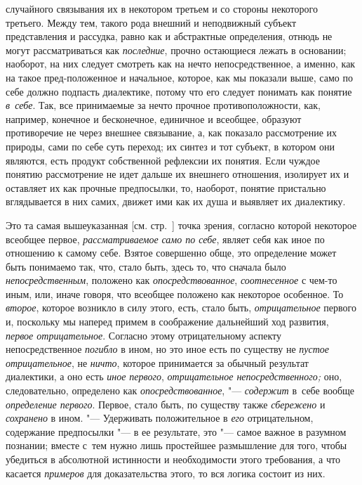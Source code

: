 случайного связывания их в некотором третьем и со стороны некоторого
третьего. Между тем, такого рода внешний и неподвижный субъект
представления и рассудка, равно как и абстрактные определения, отнюдь не
могут рассматриваться как {\em последние}, прочно
остающиеся лежать в основании; наоборот, на них следует
смотреть как на нечто непосредственное, а именно, как на такое
пред-положенное и начальное, которое, как мы показали выше, само по себе
должно подпасть диалектике, потому что его следует понимать как понятие
{\em в~себе}. Так, все
принимаемые за нечто прочное противоположности, как, например, конечное и
бесконечное, единичное и всеобщее, образуют противоречие не через внешнее
связывание, а, как показало рассмотрение их природы, сами по себе суть
переход; их синтез и тот субъект, в котором они являются, есть продукт
собственной рефлексии их понятия. Если чуждое понятию рассмотрение не идет
дальше их внешнего отношения, изолирует их и оставляет их как прочные
предпосылки, то, наоборот, понятие пристально вглядывается в них самих,
движет ими как их душа и выявляет их диалектику.

Это та самая вышеуказанная [см. стр.~\pageref{bkm:bmpg224a}]
точка зрения, согласно которой некоторое всеобщее первое,
{\em рассматриваемое} {\em само по себе}, являет
себя как иное по отношению к самому себе. Взятое совершенно обще, это
определение может быть понимаемо так, что, стало быть, здесь то, что
сначала было {\em непосредственным},
положено как {\em опосредствованное}, {\em соотнесенное} с
чем-то иным, или, иначе говоря, что всеобщее положено как некоторое
особенное. То {\em второе},
которое возникло в силу этого, есть, стало быть, {\em отрицательное}
первого и, поскольку мы наперед примем в соображение
дальнейший ход развития, {\em первое
отрицательное}. Согласно этому отрицательному аспекту
непосредственное {\em погибло}
в ином, но это иное есть по существу не
{\em пустое отрицательное}, не {\em ничто},
которое принимается за обычный результат диалектики, а оно
есть {\em иное первого},
{\em отрицательное непосредственного;} оно, следовательно, определено как
{\em опосредствованное}, "--- {\em содержит} в~себе
вообще {\em определение первого}. Первое, стало быть, по существу также
{\em сбережено} и {\em сохранено} в ином. "--- Удерживать положительное в
{\em его} отрицательном, содержание предпосылки "--- в ее
результате,
это "--- самое важное в разумном познании; вместе
с~тем нужно лишь простейшее размышление для того, чтобы убедиться в
абсолютной истинности и необходимости этого требования, а что касается
{\em примеров} для доказательства этого, то вся логика состоит из них.

